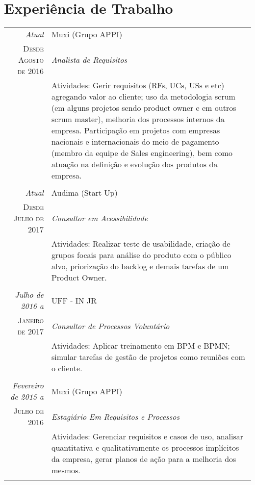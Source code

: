 \documentclass[a4paper,10pt]{article}
\begin{document}
\section{Experiência de Trabalho}
\begin{tabular}{r|p{11cm}}
 \emph{Atual} & Muxi (Grupo APPI) \\
 \textsc{Desde Agosto de 2016}&\emph{Analista de Requisitos}\\
 &\footnotesize{Atividades: Gerir requisitos (RFs, UCs, USs e etc) agregando valor ao cliente; uso da metodologia scrum (em alguns projetos sendo product owner e em outros scrum master), melhoria dos processos internos da empresa. Participação em projetos com empresas nacionais e internacionais do meio de pagamento (membro da equipe de Sales engineering), bem como atuação na definição e evolução dos produtos da empresa.}\\
  
 & \\
 
 \emph{Atual} & Audima (Start Up) \\
 \textsc{Desde Julho de 2017}&\emph{Consultor em Acessibilidade}\\
 &\footnotesize{Atividades: Realizar teste de usabilidade, criação de grupos focais para análise do produto com o público alvo, priorização do backlog e demais tarefas de um Product Owner.}\\
 
 & \\
 
 \emph{Julho de 2016 a} & UFF - IN JR \\
 \textsc{Janeiro de 2017}&\emph{Consultor de Processos Voluntário}\\
 &\footnotesize{Atividades: Aplicar treinamento em BPM e BPMN; simular tarefas de gestão de projetos como reuniões com o cliente.}\\
 
 & \\
 
 \emph{Fevereiro de 2015 a} & Muxi (Grupo APPI) \\
 \textsc{Julho de 2016}&\emph{Estagiário Em Requisitos e Processos}\\
 &\footnotesize{Atividades: Gerenciar requisitos e casos de uso, analisar quantitativa e qualitativamente os processos implícitos da empresa, gerar planos de ação para a melhoria dos mesmos.}\\
 
 & \\
 

\end{tabular}
\end{document}
